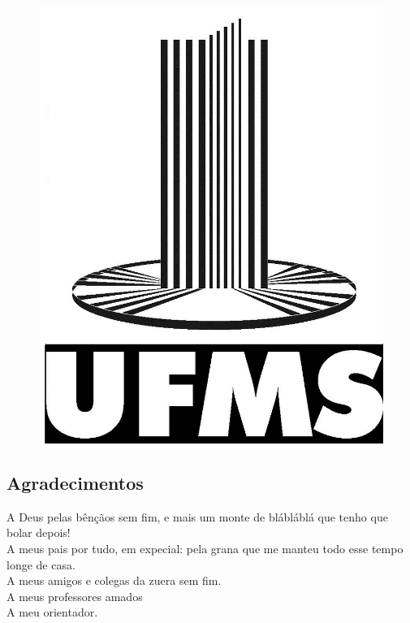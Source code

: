 \documentclass[12pt,
				openright,
				twoside,
				a4paper,
				apter=TITLE,
				section=TITLE,
				subsection=TITLE,
				chapter=TITLE,
				english,
				french,
				spanish,
				brazil]{abntex2}
\begin{document}
\frenchspacing 



\begin{figure}
\centering
\includegraphics[scale=0.3]{img/logoufms}
\end{figure}
\imprimircapa

\imprimirfolhaderosto
\imprimirtipotrabalho
\imprimirorientador




\begin{flushright}

\begin{minipage}[b]{13cm}
\vspace{15.01cm}
\chapter*{Agradecimentos}{
\calligra A Deus pelas bênçãos sem fim, e mais um monte de blábláblá que tenho que bolar depois!\\
A meus pais por tudo, em expecial: pela grana que me manteu todo esse tempo longe de casa.\\
A meus amigos e colegas da zuera sem fim.\\
A meus professores amados \\
A meu orientador.}

\end{minipage}
\end{flushright}
\end{document}
